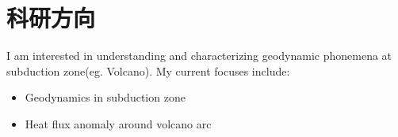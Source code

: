 \documentclass{mycv_cn}
\begin{document}
\maketitle%

\section{科研方向}

I am interested in understanding and characterizing geodynamic phonemena at subduction zone(eg. Volcano). My current focuses include:

\begin{itemize}
  \item Geodynamics in subduction zone
  \item Heat flux anomaly around volcano arc
\end{itemize}
\end{document}
